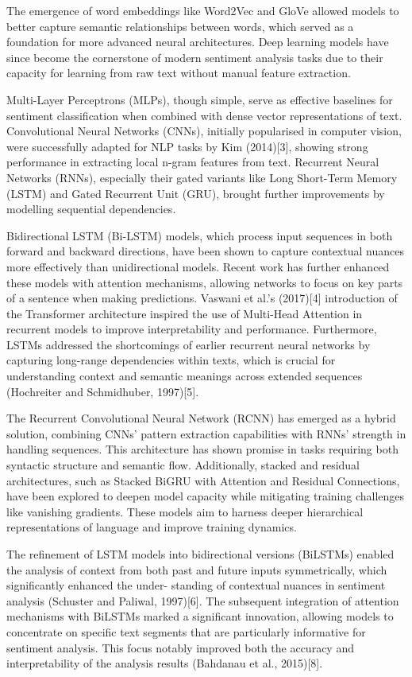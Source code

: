 \documentclass{article}
\begin{document}
The emergence of word embeddings like Word2Vec and GloVe allowed models to better capture semantic relationships between words, which served as a foundation for more advanced neural architectures. Deep learning models have since become the cornerstone of modern sentiment analysis tasks due to their capacity for learning from raw text without manual feature extraction.

Multi-Layer Perceptrons (MLPs), though simple, serve as effective baselines for sentiment classification when combined with dense vector representations of text. Convolutional Neural Networks (CNNs), initially popularised in computer vision, were successfully adapted for NLP tasks by Kim (2014)[3], showing strong performance in extracting local n-gram features from text. Recurrent Neural Networks (RNNs), especially their gated variants like Long Short-Term Memory (LSTM) and Gated Recurrent Unit (GRU), brought further improvements by modelling sequential dependencies.

Bidirectional LSTM (Bi-LSTM) models, which process input sequences in both forward and backward directions, have been shown to capture contextual nuances more effectively than unidirectional models. Recent work has further enhanced these models with attention mechanisms, allowing networks to focus on key parts of a sentence when making predictions. Vaswani et al.'s (2017)[4] introduction of the Transformer architecture inspired the use of Multi-Head Attention in recurrent models to improve interpretability and performance. Furthermore, LSTMs addressed the shortcomings of earlier recurrent neural networks by capturing long-range dependencies within texts, which is crucial for understanding context and semantic meanings across extended sequences (Hochreiter and Schmidhuber, 1997)[5].

The Recurrent Convolutional Neural Network (RCNN) has emerged as a hybrid solution, combining CNNs' pattern extraction capabilities with RNNs' strength in handling sequences. This architecture has shown promise in tasks requiring both syntactic structure and semantic flow. Additionally, stacked and residual architectures, such as Stacked BiGRU with Attention and Residual Connections, have been explored to deepen model capacity while mitigating training challenges like vanishing gradients. These models aim to harness deeper hierarchical representations of language and improve training dynamics.

The refinement of LSTM models into bidirectional versions (BiLSTMs) enabled the analysis of
context from both past and future inputs symmetrically, which significantly enhanced the under-
standing of contextual nuances in sentiment analysis (Schuster and Paliwal, 1997)[6]. The subsequent
integration of attention mechanisms with BiLSTMs marked a significant innovation, allowing models
to concentrate on specific text segments that are particularly informative for sentiment analysis. This
focus notably improved both the accuracy and interpretability of the analysis results (Bahdanau et al.,
2015)[8].
\end{document}
